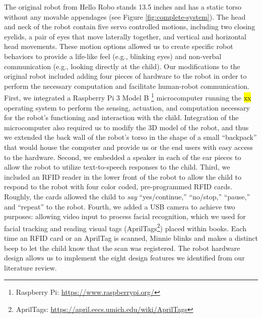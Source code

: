 \documentclass{sigchi}
\begin{document}
The original robot from Hello Robo stands 13.5 inches and has a static torso without any movable appendages (see Figure \ref{fig:complete-system}). The head and neck of the robot contain five servo controlled motions, including two closing eyelids, a pair of eyes that move laterally together, and vertical and horizontal head movements. These motion options allowed us to create specific robot behaviors to provide a life-like feel (e.g., blinking eyes) and non-verbal communication (e.g., looking directly at the child). Our modifications to the original robot included adding four pieces of hardware to the robot in order to perform the necessary computation and facilitate human-robot communication. First, we integrated a Raspberry Pi 3 Model B \footnote{Raspberry Pi: \href{https://www.raspberrypi.org/}{https://www.raspberrypi.org/}} microcomputer running the \hl{xx} operating system to perform the sensing, actuation, and computation necessary for the robot's functioning and interaction with the child. Integration of the microcomputer also required us to modify the 3D model of the robot, and thus we extended the back wall of the robot's torso in the shape of a small ``backpack'' that would house the computer and provide us or the end users with easy access to the hardware. Second, we embedded a speaker in each of the ear pieces to allow the robot to utilize text-to-speech responses to the child. Third, we included an RFID reader in the lower front of the robot to allow the child to respond to the robot with four color coded, pre-programmed RFID cards. Roughly, the cards allowed the child to \textit{say} ``yes/continue,'' ``no/stop,'' ``pause,'' and ``repeat'' to the robot. Fourth, we added a USB camera to achieve two purposes: allowing video input to process facial recognition, which we used for facial tracking and reading visual tags (AprilTags\footnote{AprilTags: \href{https://april.eecs.umich.edu/wiki/AprilTags}{https://april.eecs.umich.edu/wiki/AprilTags} }) placed within books. Each time an RFID card or an AprilTag is scanned, Minnie blinks and makes a distinct beep to let the child know that the scan was registered. The robot hardware design allows us to implement the eight design features we identified from our literature review.
\end{document}
